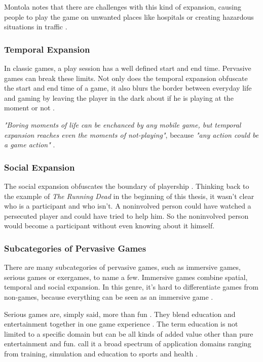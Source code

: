 Montola notes that there are challenges with this kind of expansion, causing people to play the game on unwanted places like hospitals or creating hazardous situations in traffic \citep{montola2005exploring}.

\subsubsection{Temporal Expansion}
In classic games, a play session has a well defined start and end time. Pervasive games can break these limits. Not only does the temporal expansion obfuscate the start and end time of a game, it also blurs the border between everyday life and gaming by leaving the player in the dark about if he is playing at the moment or not \citep{montola2005exploring}.

\emph{"Boring moments of life can be enchanced by any mobile game, but temporal expansion reaches even the moments of not-playing"}, because \emph{"any action could be a game action"} \citep{montola2005exploring}.

\subsubsection{Social Expansion}
The social expansion obfuscates the boundary of playership \citep{montola2005exploring}. Thinking back to the example of \emph{The Running Dead} in the beginning of this thesis, it wasn't clear who is a participant and who isn't. A noninvolved person could have watched a persecuted player and could have tried to help him. So the noninvolved person would become a participant without even knowing about it himself.

\subsubsection{Subcategories of Pervasive Games}
There are many subcategories of pervasive games, such as immersive games, serious games or exergames, to name a few. Immersive games combine spatial, temporal and social expansion. In this genre, it's hard to differentiate games from non-games, because everything can be seen as an immersive game \citep{mcgonigal2003}.

Serious games are, simply said, more than fun \citep{sawyer2008serious}. They blend education and entertainment together in one game experience \citep{ritterfeld2009serious}. The term education is not limited to a specific domain but can be all kinds of added value other than pure entertainment and fun. \citeauthor{gobel2010serious} call it a broad spectrum of application domains ranging from training, simulation and education to sports and health \citep{gobel2010serious}.

